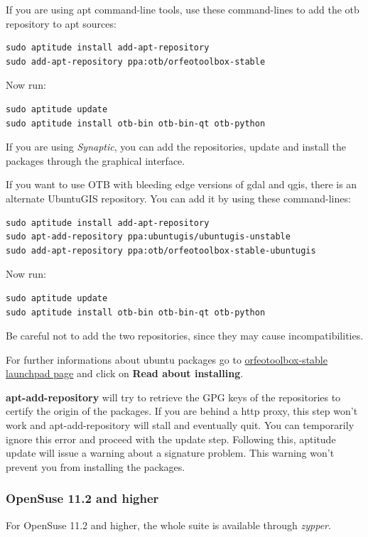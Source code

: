 If you are using apt command-line tools, use these command-lines to add the otb repository to apt sources:
\begin{verbatim}
sudo aptitude install add-apt-repository 
sudo add-apt-repository ppa:otb/orfeotoolbox-stable
\end{verbatim}
Now run:
\begin{verbatim}
sudo aptitude update
sudo aptitude install otb-bin otb-bin-qt otb-python
\end{verbatim}

If you are using \emph{Synaptic}, you can add the repositories, update and install the packages through the graphical interface.

If you want to use OTB with bleeding edge versions of gdal and qgis,
there is an alternate UbuntuGIS repository.  You can add it by using
these command-lines:
\begin{verbatim}
sudo aptitude install add-apt-repository 
sudo apt-add-repository ppa:ubuntugis/ubuntugis-unstable
sudo add-apt-repository ppa:otb/orfeotoolbox-stable-ubuntugis
\end{verbatim}
Now run:
\begin{verbatim}
sudo aptitude update
sudo aptitude install otb-bin otb-bin-qt otb-python
\end{verbatim}

Be careful not to add the two repositories, since they may cause incompatibilities.

For further informations about ubuntu packages go to
\href{https://launchpad.net/~otb/+archive/orfeotoolbox-stable}{orfeotoolbox-stable
  launchpad page} and click on \textbf{Read about installing}.

\textbf{apt-add-repository} will try to retrieve the GPG keys of the
repositories to certify the origin of the packages. If you are behind
a http proxy, this step won't work and apt-add-repository will stall
and eventually quit. You can temporarily ignore this error and proceed
with the update step. Following this, aptitude update will issue a
warning about a signature problem. This warning won't prevent you from
installing the packages.

\subsubsection{OpenSuse 11.2 and higher}
\label{ssec:opensuse_binaries}

For OpenSuse 11.2 and higher, the whole \otb suite is available
through \emph{zypper}.


